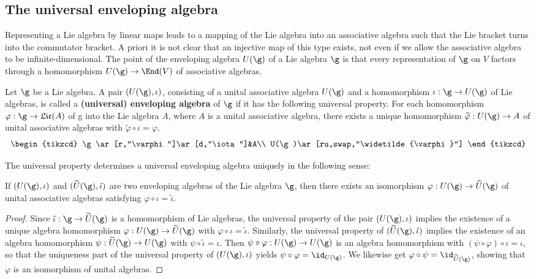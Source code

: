 \subsection{The universal enveloping algebra}
Representing a Lie algebra by linear maps leads to a mapping of the Lie algebra into an associative algebra such that the Lie bracket turns into the commutator bracket. A priori it is not clear that an injective map of this type exists, not even if we allow the associative algebra to be infinite-dimensional. The point of the enveloping algebra $U(\g)$ of a Lie algebra $\g$ is that every representation of $\g$ on $V$ factors through a homomorphism $U(\g)\to\End(V)$ of associative algebras.
\begin{definition}
Let $\g$ be a Lie algebra. A pair $(U(\g),\iota)$, consisting of a unital associative algebra $U(\g)$ and a homomorphism $\iota:\g\to U(\g)$ of Lie algebras, is called a \textbf{(universal) enveloping algebra} of $\g$ if it has the following universal property. For each homomorphism $\varphi:\g\to \mathfrak{Lie}(A)$ of g into the Lie algebra $A$, where $A$ is a unital associative algebra, there exists a unique homomorphism $\widetilde{\varphi}:U(\g)\to A$ of unital associative algebras with $\widetilde{\varphi}\circ\iota=\varphi$.
\[\begin{tikzcd}
\g\ar[r,"\varphi"]\ar[d,"\iota"]&A\\
U(\g)\ar[ru,swap,"\widetilde{\varphi}"]
\end{tikzcd}\]
\end{definition}
The universal property determines a universal enveloping algebra uniquely in the following sense:
\begin{lemma}
If $(U(\g),\iota)$ and $(\widetilde{U}(\g),\tilde{\iota})$ are two enveloping algebras of the Lie algebra $\g$, then there exists an isomorphism $\varphi:U(\g)\to\widetilde{U}(\g)$ of unital associative algebras satisfying $\varphi\circ\iota=\tilde{\iota}$.
\end{lemma}
\begin{proof}
Since $\tilde{\iota}:\g\to\widetilde{U}(\g)$ is a homomorphism of Lie algebras, the universal property of the pair $(U(\g),\iota)$ implies the existence of a unique algebra homomorphism $\varphi:U(\g)\to\widetilde{U}(\g)$ with $\varphi\circ\iota=\tilde{\iota}$. Similarly, the universal property of $(\widetilde{U}(\g),\tilde{\iota})$ implies the existence of an algebra homomorphism $\psi:\widetilde{U}(\g)\to U(\g)$ with $\psi\circ\tilde{\iota}=\iota$. Then $\psi\circ\varphi:U(\g)\to U(\g)$ is an algebra homomorphism with $(\psi\circ\varphi)\circ\iota=\iota$, so that the uniqueness part of the universal property of $(U(\g),\iota)$ yields $\psi\circ\varphi=\id_{U(\g)}$. We likewise get $\varphi\circ\psi=\id_{\widetilde{U}(\g)}$, showing that $\varphi$ is an isomorphism of unital algebras.
\end{proof}
